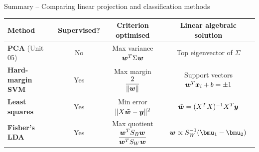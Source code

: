 \documentclass[aspectratio=169]{beamer}\usepackage[]{graphicx}\usepackage[]{xcolor}
\begin{document}
\begin{frame}{Summary -- Comparing linear projection and classification methods}
    \centering
    \renewcommand{\arraystretch}{1.45}
    \scriptsize
    \begin{tabular}{@{}lccc@{}}
        \toprule
        \textbf{Method} & \textbf{Supervised?} & \textbf{Criterion optimised} & \textbf{Linear algebraic solution} \\
        \midrule
        \textbf{PCA} (Unit 05) & No & Max variance $\bm{w}^T \Sigma \bm{w}$ & Top eigenvector of $\Sigma$ \\
        \textbf{Hard-margin SVM} & Yes & Max margin $\dfrac{2}{\|\bm{w}\|}$ & Support vectors $\bm{w}^T \bm{x}_i + b = \pm 1$ \\
        \textbf{Least squares} & Yes & Min error $\|X\tilde{\bm{w}} - \bm{y}\|^2$ & $\tilde{\bm{w}} = (X^T X)^{-1} X^T \bm{y}$ \\
        \textbf{Fisher's LDA} & Yes & Max quotient $\dfrac{\bm{w}^T S_B \bm{w}}{\bm{w}^T S_W \bm{w}}$ & $\bw \propto S_W^{-1}(\bmu_1 - \bmu_2)$ \\
        \bottomrule
    \end{tabular}
\end{frame}





\end{document}
